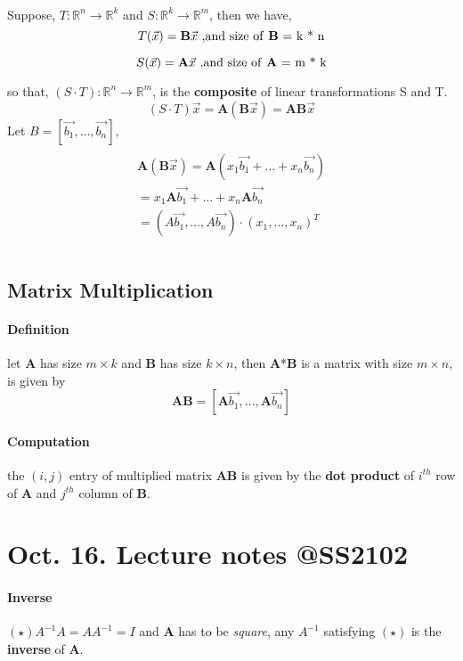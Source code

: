 \documentclass{article}
\begin{document}
	\paragraph{}Suppose, $T:\mathbb{R}^n \rightarrow \mathbb{R}^k$ and $S:\mathbb{R}^k \rightarrow \mathbb{R}^m$, then we have,
	\[
	T(\vec{x}) = \textbf{B}\vec{x} \text{ ,and size of \textbf{B} = k * n}
	\]
	
	\[
	S(\vec{x}) = \textbf{A}\vec{x} \text{ ,and size of \textbf{A} = m * k}
	\]
	
	so that, $(S \cdot T):\mathbb{R}^n \rightarrow \mathbb{R}^m$, is the \textbf{composite} of linear transformations S and T.
	\[
	(S \cdot T) \vec{x} = \textbf{A} (\textbf{B} \vec{x}) = \textbf{A} \textbf{B} \vec{x}
	\]
	Let $B = [\vec{b_1},\dots,\vec{b_n}]$, 
	\begin{multline}
	\\
	\textbf{A}(\textbf{B}\vec{x}) = \textbf{A}(x_1\vec{b_1} + \dots + x_n\vec{b_n})\\
	= x_1\textbf{A}\vec{b_1} + \dots + x_n\textbf{A}\vec{b_n}\\
	= (A\vec{b_1},\dots,A\vec{b_n}) \cdot (x_1,\dots,x_n)^T \\
	\\
	\end{multline}
	\subsection{Matrix Multiplication}
	\paragraph{Definition} let \textbf{A} has size $m \times k$ and \textbf{B} has size $k \times n$, then \textbf{A}*\textbf{B} is a matrix with size $m \times n$, is given by
	\[
	\textbf{A}\textbf{B} = [\textbf{A}\vec{b_1},\dots,\textbf{A}\vec{b_n}]
	\]
	\paragraph{Computation} the $(i,j)$ entry of multiplied matrix \textbf{A}\textbf{B} is given by the \textbf{dot product} of $i^{th}$ row of \textbf{A} and $j^{th}$ column of \textbf{B}.
	\section{Oct. 16. Lecture notes @SS2102}
	\paragraph{Inverse} $(\star) A^{-1} A = A A^{-1} = I$ and \textbf{A} has to be \emph{square}, any $A^{-1}$ satisfying $(\star)$ is the \textbf{inverse} of \textbf{A}.
\end{document}
